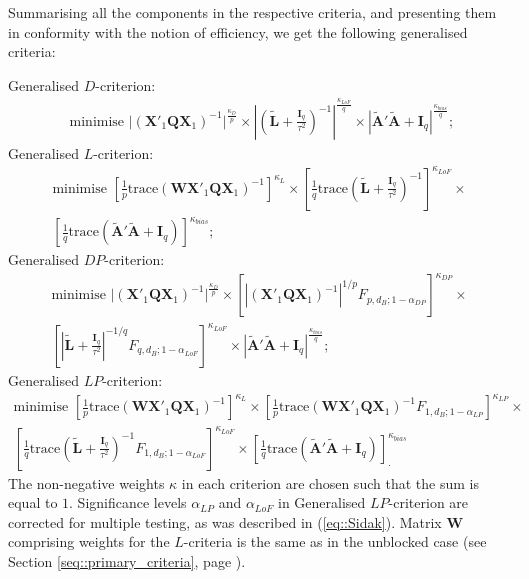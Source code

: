 Summarising all the components in the respective criteria, and presenting them in conformity with the notion of efficiency, we get the following generalised criteria:

Generalised $D$-criterion:
\begin{align}
\label{eq::GD_eff_blocks}
\mbox{ minimise } \vert (\bm{X}'_{1}\bm{Q}\bm{X}_{1})^{-1}\vert^{\frac{\kappa_D}{p}}\times \left|\left(\bm{\tilde{L}}+\frac{\bm{I}_{q}}{\tau^{2}}\right)^{-1}\right|^{\frac{\kappa_{LoF}}{q}}\times |\bm{\tilde{A}}'\bm{\tilde{A}}+\bm{I}_{q}|^{\frac{\kappa_{bias}}{q}};
\end{align}
Generalised $L$-criterion:
\begin{multline}
\label{eq::GL_eff_blocks}
\mbox{minimise } \left[\frac{1}{p}\mbox{trace}(\bm{W}\bm{X}'_{1}\bm{Q}\bm{X}_{1})^{-1}\right]^{\kappa_{L}}\times \left[\frac{1}{q}\mbox{trace}\left(\bm{\tilde{L}}+\frac{\bm{I}_{q}}{\tau^{2}}\right)^{-1}\right]^{\kappa_{LoF}}\times\\ \left[\frac{1}{q}\mbox{trace}(\bm{\tilde{A}}'\bm{\tilde{A}}+\bm{I}_{q})\right]^{\kappa_{bias}};
\end{multline}
Generalised $DP$-criterion:
\begin{multline}
\label{eq::GDP_eff_blocks}
\mbox{minimise } \vert (\bm{X}'_{1}\bm{Q}\bm{X}_{1})^{-1}\vert^{\frac{\kappa_D}{p}}\times \left[\left|(\bm{X}'_{1}\bm{Q}\bm{X}_{1})^{-1}\right|^{1/p}F_{p,d_B;1-\alpha_{DP}}\right]^{\kappa_{DP}} \times \\ \left[\left|\bm{\tilde{L}}+\frac{\bm{I}_{q}}{\tau^{2}}\right|^{-1/q}F_{q,d_B;1-\alpha_{LoF}}\right]^{\kappa_{LoF}} \times |\bm{\tilde{A}}'\bm{\tilde{A}}+\bm{I}_{q}|^{\frac{\kappa_{bias}}{q}};
\end{multline}
Generalised $LP$-criterion:
\begin{multline}
\label{eq::GLP_eff_blocks}
\mbox{minimise } \left[\frac{1}{p}\mbox{trace}(\bm{WX}'_{1}\bm{Q}\bm{X}_{1})^{-1}\right]^{\kappa_{L}}\times\left[\frac{1}{p}\mbox{trace}(\bm{WX}'_{1}\bm{Q}\bm{X}_{1})^{-1}F_{1,d_B;1-\alpha_{LP}}\right]^{\kappa_{LP}}\times \\ \left[\frac{1}{q}\mbox{trace}\left(\bm{\tilde{L}}+\frac{\bm{I}_{q}}{\tau^{2}}\right)^{-1}F_{1,d_B;1-\alpha_{LoF}}\right]^{\kappa_{LoF}}\times\left[\frac{1}{q}\mbox{trace}(\bm{\tilde{A}}'\bm{\tilde{A}}+\bm{I}_{q})\right]^{\kappa_{bias}}_{.}
\end{multline}
The non-negative weights $\kappa$ in each criterion are chosen such that the sum is equal to $1$. Significance levels $\alpha_{LP}$ and $\alpha_{LoF}$ in Generalised $LP$-criterion are corrected for multiple testing, as was described in (\ref{eq::Sidak}). Matrix $\bm{W}$ comprising weights for the $L$-criteria is the same as in the unblocked case (see Section \ref{seq::primary_criteria}, page \pageref{W_matrix}).

